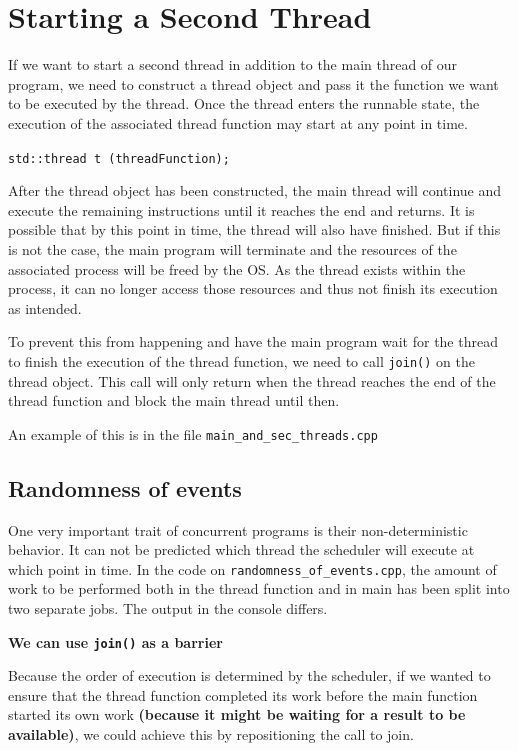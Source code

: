 \documentclass[11pt, a4paper]{article}
\begin{document}
\section{Starting a Second Thread}%
\label{sec:starting_a_second_thread}



If we want to start a second thread in addition to the main thread of our program, we need to construct a thread object and pass it the function we want to be executed by the thread. Once the thread enters the runnable state, the execution of the associated thread function may start at any point in time.

\texttt{std::thread t (threadFunction);} 


After the thread object has been constructed, the main thread will continue and execute the remaining instructions until it reaches the end and returns. It is possible that by this point in time, the thread will also have finished. But if this is not the case, the main program will terminate and the resources of the associated process will be freed by the OS. As the thread exists within the process, it can no longer access those resources and thus not finish its execution as intended.

To prevent this from happening and have the main program wait for the thread to finish the execution of the thread function, we need to call \texttt{join()} on the thread object. This call will only return when the thread reaches the end of the thread function and block the main thread until then.  

An example of this is in the file \texttt{main\_and\_sec\_threads.cpp}


\subsection{Randomness of events}%
\label{sub:randomness_of_events}

One very important trait of concurrent programs is their non-deterministic behavior. It can not be predicted which thread the scheduler will execute at which point in time. In the code on \texttt{randomness\_of\_events.cpp}, the amount of work to be performed both in the thread function and in main has been split into two separate jobs. The output in the console differs. 


\textbf{We can use \texttt{join()} as a barrier}

Because the order of execution is determined by the scheduler, if we wanted to ensure that the thread function completed its work before the main function started its own work \textbf{(because it might be waiting for a result to be available)}, we could achieve this by repositioning the call to join.
\end{document}
